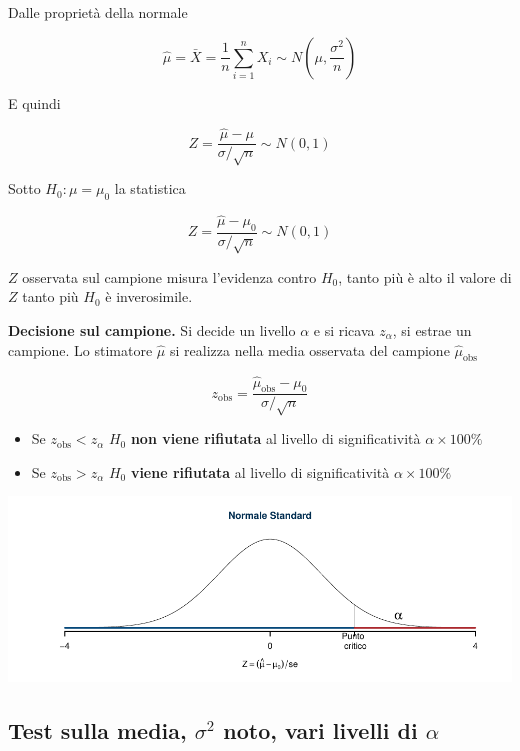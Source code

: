 \documentclass[
  11pt,
]{book}
\providecommand{\tightlist}{%
  \setlength{\itemsep}{0pt}\setlength{\parskip}{0pt}}
\theoremstyle{mytheoremstyle}
\theoremstyle{mydefstyle}
\begin{document}
Dalle proprietà della normale

\[\hat\mu=\bar X=\frac 1 n\sum_{i=1}^nX_i\sim N\left(\mu,\frac{\sigma^2} {n}\right)\]

E quindi

\[Z=\frac{\hat\mu-\mu}{\sigma/\sqrt n}\sim N(0,1)\]

Sotto \(H_0: \mu=\mu_0\) la statistica

\[Z=\frac{\hat\mu-\mu_0}{\sigma/\sqrt n}\sim N(0,1)\]

\(Z\) osservata sul campione misura l'evidenza contro \(H_0\), tanto più è
alto il valore di \(Z\) tanto più \(H_0\) è inverosimile.

\begin{info}

\textbf{Decisione sul campione.} Si decide un livello \(\alpha\) e si ricava
\(z_\alpha\), si estrae un campione. Lo stimatore \(\hat\mu\) si realizza
nella media osservata del campione \(\hat\mu_\text{obs}\)

\[z_{\text{obs}}=\frac{\hat\mu_\text{obs} -\mu_0}{\sigma/\sqrt n}\]

\begin{itemize}
\tightlist
\item
  Se \(z_{\text{obs}}<z_\alpha\) \(H_0\) \textbf{non viene rifiutata} al
  livello di significatività \(\alpha\times100\%\)
\item
  Se \(z_{\text{obs}}>z_\alpha\) \(H_0\) \textbf{viene rifiutata} al livello di
  significatività \(\alpha\times100\%\)
\end{itemize}

\begin{center}\includegraphics{Appunti_di_Statistica_2025_files/figure-latex/15-test-mu-pi-14-1} \end{center}

\end{info}

\subsection{\texorpdfstring{Test sulla media, \(\sigma^2\) noto, vari livelli di \(\alpha\)}{Test sulla media, \textbackslash sigma\^{}2 noto, vari livelli di \textbackslash alpha}}\label{test-sulla-media-sigma2-noto-vari-livelli-di-alpha}
\end{document}
